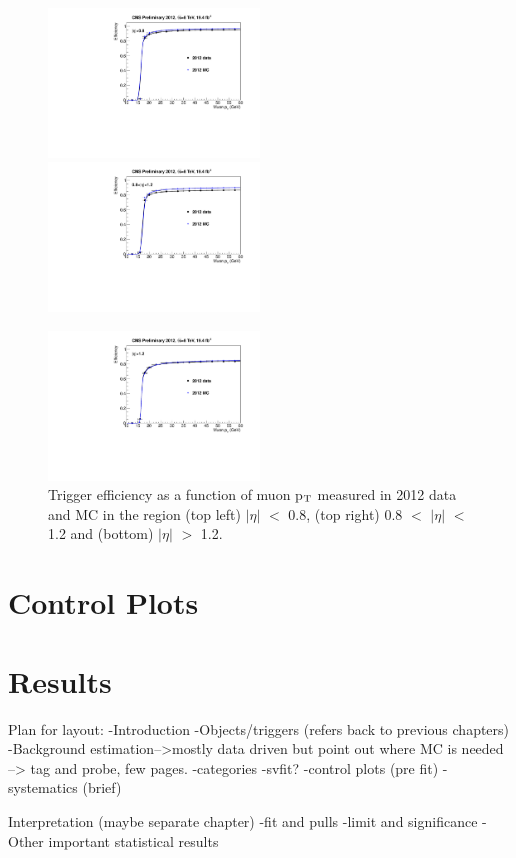 \begin{figure}[h!]
\includegraphics[width=0.5\textwidth]{plots/TagAndProbe/MuonAbsEta082012DatavsMC.pdf}
\includegraphics[width=0.5\textwidth]{plots/TagAndProbe/MuonAbsEta122012DatavsMC.pdf}
\begin{center}
\includegraphics[width=0.5\textwidth]{plots/TagAndProbe/MuonAbsEndcap2012DatavsMC.pdf}
\end{center}
\caption{Trigger efficiency as a function of muon p$_{\rm{T}}$ measured in
2012 data and MC in the region (top left) $|\eta|$ $<$ 0.8, (top right) 0.8
$<$ $|\eta|$ $<$ 1.2 and (bottom) $|\eta|$ $>$ 1.2.}
\label{fig:muontrg}
\end{figure}


\section{Control Plots}

\section{Results}

Plan for layout:
-Introduction
-Objects/triggers (refers back to previous chapters)
-Background estimation-->mostly data driven but point out where MC is needed -->
tag and probe, few pages.
-categories
-svfit?
-control plots (pre fit)
-systematics (brief)

Interpretation (maybe separate chapter)
-fit and pulls
-limit and significance
-Other important statistical results
